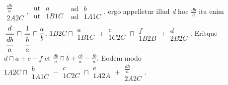 $\begin{array}{c} 
\displaystyle\frac{db}{a}\\ {\scriptstyle \textit{2}}A{\scriptstyle \textit{2}}C\end{array}$, %
$\begin{array}{cc}
\textrm{ut} & a \\\textrm{ut} & {\scriptstyle \textit{1}}B{\scriptstyle \textit{1}}C\end{array}$
$\begin{array}{cc} 
\textrm{ad} & b \\\textrm{ad} & {\scriptstyle \textit{1}}A{\scriptstyle \textit{1}}C\end{array}$,
%
%
ergo
appelletur illud \textit{d} hoc $\displaystyle\frac{db}{a}$ ita enim %
%
$\displaystyle\doublefrac{d}{\displaystyle\frac{db}{a}} \sqcap \displaystyle\doublefrac{1}{\displaystyle\frac{b}{a}} \sqcap \displaystyle\frac{a}{b}$.
\pend \pstart
\noindent
%
${\scriptstyle \textit{1}}B{\scriptstyle \textit{2}}C \sqcap \begin{array}{c}a\\{\scriptstyle \textit{1}}B{\scriptstyle \textit{1}}C\end{array} + \begin{array}{c}c\\{\scriptstyle \textit{1}}C{\scriptstyle \textit{2}}C\end{array} \sqcap \begin{array}{c}f\\{\scriptstyle \textit{1}}B{\scriptstyle \textit{2}}B\end{array}+ \begin{array}{c}d\\{\scriptstyle \textit{2}}B{\scriptstyle \textit{2}}C\end{array}$.
%
Eritque
%
$d \sqcap a+c-f$
%
et
%
$\displaystyle\frac{db}{a} \sqcap b + \displaystyle\frac{cb}{a} - \displaystyle\frac{fb}{a}$.
%
Eodem modo
${\scriptstyle \textit{1}}A{\scriptstyle \textit{2}}C \sqcap \begin{array}{c}b\\{\scriptstyle \textit{1}}A{\scriptstyle \textit{1}}C\end{array} - \begin{array}{c}c\\{\scriptstyle \textit{1}}C{\scriptstyle \textit{2}}C\end{array} \sqcap \begin{array}{c}e\\{\scriptstyle \textit{1}}A{\scriptstyle \textit{2}}A\end{array}+ \begin{array}{c}\displaystyle\frac{db}{a}\\{\scriptstyle \textit{2}}A{\scriptstyle \textit{2}}C\end{array}$.
